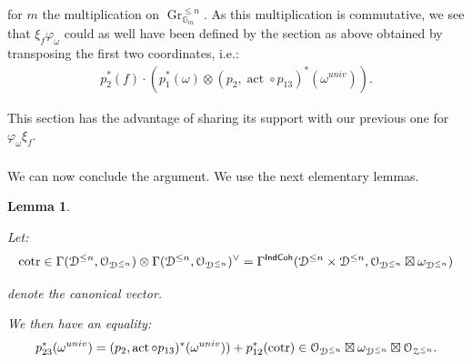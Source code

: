 \documentclass[reqno,11pt]{amsart}
\numberwithin{equation}{subsection}
\newtheorem{lem}[thm]{Lemma}
\theoremstyle{remark}
\newcommand{\bG}{{\mathbb G}}
\newcommand{\sD}{{\EuScript D}}
\newcommand{\sO}{{\EuScript O}}
\newcommand{\sZ}{{\EuScript Z}}
\newcommand{\on}{\operatorname}
\newcommand{\cotr}{\on{cotr}}
\newcommand{\act}{\on{act}}
\newcommand{\vph}{\varphi}
\newcommand{\Gr}{\on{Gr}}
\newcommand{\IndCoh}{\mathsf{IndCoh}}
\begin{document}
\noindent for $m$ the multiplication on $\Gr_{\bG_m}^{\leq n}$.
As this multiplication is commutative, we see that
$\xi_f\vph_{\omega}$ could as well have been defined
by the section as above obtained by transposing
the first two coordinates, i.e.:
%
\[
\begin{gathered}
p_2^*(f) \cdot 
(p_1^*(\omega) \otimes (p_2,\act \circ p_{13})^*(\omega^{univ})).
\end{gathered}
\]

\noindent This section has the advantage of
sharing its support with our previous one for 
$\vph_{\omega}\xi_f$.

\subsubsection{}

We can now conclude the argument. We use the next elementary lemmas.

\begin{lem}\label{l:cotr-1}

Let: 
%
\[
\cotr \in 
\Gamma(\sD^{\leq n},\sO_{\sD^{\leq n}}) \otimes
\Gamma(\sD^{\leq n},\sO_{\sD^{\leq n}})^{\vee} = 
\Gamma^{\IndCoh}(\sD^{\leq n} \times \sD^{\leq n},
\sO_{\sD^{\leq n}} \boxtimes \omega_{\sD^{\leq n}})
\]

\noindent denote the canonical vector. 

We then have an equality:
%
\[
p_{23}^*(\omega^{univ}) = 
(p_2,\act \circ p_{13})^*(\omega^{univ}))
+p_{12}^*(\cotr)
\in 
\sO_{\sD^{\leq n}} \boxtimes 
\omega_{\sD^{\leq n}} \boxtimes \sO_{\sZ^{\leq n}}.
\]

\end{lem}
\end{document}
